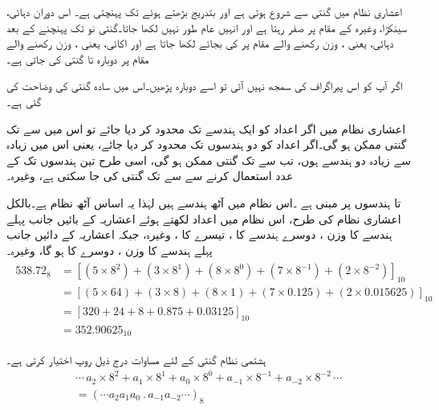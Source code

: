 	اعشاری نظام میں گنتی  سے شروع ہوتی ہے اور بتدریج بڑھتے ہوئے  تک پہنچتی ہے۔ اس دوران دہائی، سینکڑا، وغیرہ کے مقام پر صفر رہتا ہے اور انہیں عام طور نہیں لکھا جاتا۔گنتی نو تک پہنچنے کے بعد دہائی، یعنی ، وزن رکھنے والے مقام پر  کی بجائے  لکھا جاتا ہے اور اکائی، یعنی ، وزن رکھنے والے مقام پر دوبارہ  تا  گنتی کی جاتی ہے۔ 
	
	اگر آپ کو اس پیراگراف کی سمجھ نہیں آئی تو اسے دوبارہ پڑھیں۔اس میں سادہ گنتی کی وضاحت کی گئی ہے۔ 
	
	اعشاری نظام میں اگر اعداد کو ایک ہندسے تک محدود کر دیا جائے تو اس میں  سے  تک گنتی ممکن ہو گی۔اگر اعداد کو دو ہندسوں تک محدود کر دیا جائے، یعنی اس میں زیادہ سے زیادہ دو ہندسے ہوں، تب  سے  تک گنتی ممکن ہو گی، اسی طرح تین ہندسوں تک کے عدد استعمال کرنے سے  سے  تک گنتی کی جا سکتی ہے، وغیرہ۔
	 


	  تا  ہندسوں پر مبنی ہے ۔اس نظام میں آٹھ ہندسے ہیں لہٰذا یہ اساس آٹھ نظام ہے۔بالکل اعشاری نظام کی طرح، اس نظام میں اعداد لکھتے ہوئے اعشاریہ کے بائیں جانب پہلے ہندسے کا وزن  ، دوسرے ہندسے کا  ، تیسرے کا ، وغیرہ، جبکہ اعشاریہ کے دائیں جانب پہلے ہندسے کا وزن ، دوسرے کا  ہو گا، وغیرہ۔
\begin{gather}
\begin{aligned}\label{مساوات_ثنائی_آٹھ}
538.72_8&=[(5\times 8^2)+(3\times 8^1)+(8\times8^0)+(7\times 8^{-1})+(2\times 8^{-2})]_{10}\\
&=[(5\times 64)+(3\times 8)+(8\times 1)+(7\times 0.125)+(2\times 0.015625)]_{10}\\
&=[320+24+8+0.875+0.03125]_{10}\\
&=352.90625_{10}
\end{aligned}
\end{gather}

	 ہشتمی نظام گنتی کے لئے مساوات  درج ذیل روپ اختیار کرتی ہے۔
\begin{multline}
\cdots\, a_2\times 8^2+a_1\times 8^1+a_0\times 8^0+a_{-1}\times 8^{-1}+a_{-2}\times 8^{-2}\,\cdots\\
=(\cdots a_2a_1a_0\ . \,a_{-1}a_{-2}\cdots)_{8}
\end{multline}

